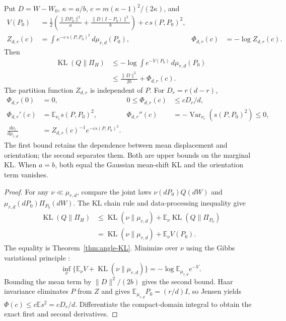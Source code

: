 \begin{theorem}
\label{thm:mixture-orientation-KL}
Put $D=W-W_0$, $\kappa=a/b$, $c=m(\kappa-1)^2/(2\kappa)$, and
\begin{align}
 V(P_0)&=\tfrac12\left(\frac{\|DP_0\|^2}{a}
                          +\frac{\|D(I-P_0)\|^2}{b}\right)
                         +c\,s(P,P_0)^2,\\
 Z_{d,r}(c)&=\int e^{-c\,s(P,P_0)^2}\,d\mu_{r,d}(P_0),&
 \Phi_{d,r}(c)&=-\log Z_{d,r}(c).
\end{align}
Then
\begin{align}
 \operatorname{KL}(Q\|\Pi_H)
 &\le-\log\int e^{-V(P_0)}\,d\mu_{r,d}(P_0)\label{eq:Haar-joint-bound}\\
 &\le\frac{\|D\|^2}{2b}+\Phi_{d,r}(c).
 \label{eq:learned-orientation-complexity}
\end{align}
The partition function $Z_{d,r}$ is independent of $P$. For
$D_r=r(d-r)$,
\begin{align}
 \Phi_{d,r}(0)&=0,&0\le\Phi_{d,r}(c)&\le cD_r/d,\\
 \Phi_{d,r}'(c)&=\mathbb E_{\nu_c}s(P,P_0)^2,&
 \Phi_{d,r}''(c)&=-\operatorname{Var}_{\nu_c}(s(P,P_0)^2)\le0,\\
 \frac{d\nu_c}{d\mu_{r,d}}&=Z_{d,r}(c)^{-1}e^{-cs(P,P_0)^2}.
\end{align}
The first bound retains the dependence between mean displacement and
orientation; the second separates them. Both are upper bounds on the
marginal KL. When $a=b$, both equal the Gaussian mean-shift KL and the
orientation term vanishes.
\end{theorem}
\begin{proof}
For any $\nu\ll\mu_{r,d}$, compare the joint laws
$\nu(dP_0)Q(dW)$ and $\mu_{r,d}(dP_0)\Pi_{P_0}(dW)$.
The KL chain rule and data-processing inequality
\cite{cover2006information} give
\begin{align}
 \operatorname{KL}(Q\|\Pi_H)
 &\le\operatorname{KL}(\nu\|\mu_{r,d})
                +\mathbb E_\nu\operatorname{KL}(Q\|\Pi_{P_0})\\
 &=\operatorname{KL}(\nu\|\mu_{r,d})+\mathbb E_\nu V(P_0).
\end{align}
The equality is Theorem~\ref{thm:angle-KL}. Minimize over $\nu$ using the
Gibbs variational principle \cite{donsker1975asymptotic}:
\begin{equation}
 \inf_\nu\{\mathbb E_\nu V+\operatorname{KL}(\nu\|\mu_{r,d})\}
                 =-\log\mathbb E_{\mu_{r,d}}e^{-V}.
\end{equation}
Bounding the mean term by $\|D\|^2/(2b)$ gives the second bound.
Haar invariance eliminates $P$ from $Z$ and gives
$\mathbb E_{\mu_{r,d}}P_0=(r/d)I$, so Jensen yields
$\Phi(c)\le c\mathbb E s^2=cD_r/d$. Differentiate the compact-domain
integral to obtain the exact first and second derivatives.
\end{proof}

